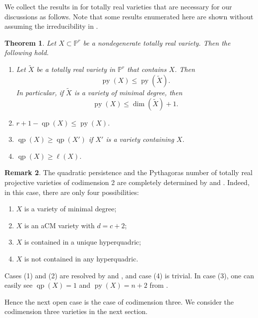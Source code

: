 \documentclass[11pt,letterpaper,reqno]{amsart}
\theoremstyle{plain}
\newtheorem{theorem}{Theorem}[section]
\theoremstyle{definition}
\newtheorem{remark}[theorem]{Remark}
\newtheorem{open problem}[theorem]{Open Problem}
\newtheorem{remark and notation}[theorem]{Remark and Notation}
\newtheorem{remark and definition}[theorem]{Remark and Definition}
\newtheorem{definition and notation}[theorem]{Definition and Notation}
\newtheorem{notation and convention}[theorem]{Notation and Convention}
\newtheorem{notation and remark}[theorem]{Notation and Remark}
\newtheorem{convention and notation}[theorem]{Convention and Notation}
\def \p {\mathbb{P}}
\def \py {\operatorname{py}}
\def \qp {\operatorname{qp}}
\begin{document}
    We collect the results in \cite{MR4397034} for totally real varieties that are necessary for our discussions as follows. Note that some results enumerated here are shown without assuming the irreducibility in \cite{MR4397034}.
    \begin{theorem}\cite{MR4397034}\label{thm:qpmain}
        Let $X\subset\p^r$ be a nondegenerate totally real variety.
        Then the following hold.
        \begin{enumerate}[\rm (1)]
            \item Let $\widetilde{X}$ be a totally real variety in $\mathbb{P}^r$ that contains $X$. Then 
                \begin{equation*}\py(X) \leq \py (\widetilde{X}).
                \end{equation*}
                In particular, if $\widetilde{X}$ is a variety of minimal degree, then \begin{equation*}\py(X) \leq \dim (\widetilde{X}) + 1.
                \end{equation*}
            \item $r+1-\qp(X)\le \py(X)$.
            \item $\qp(X)\geq \qp(X')$ if $X'$ is a variety containing $X$.
            \item $\qp(X)\geq \ell(X)$.
        \end{enumerate}
    \end{theorem}

\begin{remark}\label{rem:codim_two}
	The quadratic persistence and the Pythagoras number of totally real projective varieties of codimension 2 are completely determined by  and . Indeed, in this case, there are only four possibilities:
	\begin{enumerate}
		\item $X$ is a variety of minimal degree;
		\item $X$ is an aCM variety with $d=c+2$;
		\item $X$ is contained in a unique hyperquadric;
		\item $X$ is not contained in any hyperquadric.
	\end{enumerate}
	Cases (1) and (2) are resolved by  and , and case (4) is trivial. In case (3), one can easily see $\qp(X)=1$ and $\py(X)=n+2$ from .
\end{remark}

Hence the next open case is the case of codimension three.
We consider the codimension three varieties in the next section.
\end{document}
